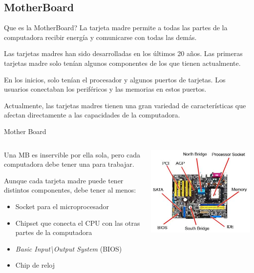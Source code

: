 \documentclass[11pt]{beamer}
\begin{document}
	\subsection{MotherBoard}
		\begin{frame}{Que es la MotherBoard?}
			La tarjeta madre permite a todas las partes de la computadora recibir energía y comunicarse con todas las demás.
			
			Las tarjetas madres han sido desarrolladas en los últimos 20 años. Las primeras tarjetas madre solo tenían algunos componentes de los que tienen actualmente.
			
			En los inicios, solo tenían el procesador y algunos puertos de tarjetas. Los usuarios conectaban los periféricos y las memorias en estos puertos.
			
			Actualmente, las tarjetas madres tienen una gran variedad de características que afectan directamente a las capacidades de la computadora.
		\end{frame}
		\begin{frame}{Mother Board}
			\begin{columns}
				\begin{column}{0.5\textwidth}
					Una MB es inservible por ella sola, pero cada computadora debe tener una para trabajar.
					
					Aunque cada tarjeta madre puede tener distintos componentes, debe tener al menos:
					\begin{itemize}
						\item Socket para el microprocesador
						\item Chipset que conecta el CPU con las otras partes de la computadora
						\item \textit{Basic Input\textbackslash Output System} (BIOS)
						\item Chip de reloj
					\end{itemize}										
				\end{column}
				\begin{column}{0.5\textwidth}
					\includegraphics[scale=0.4]{mb.jpg}
				\end{column}
			\end{columns}
		\end{frame}
\end{document}

